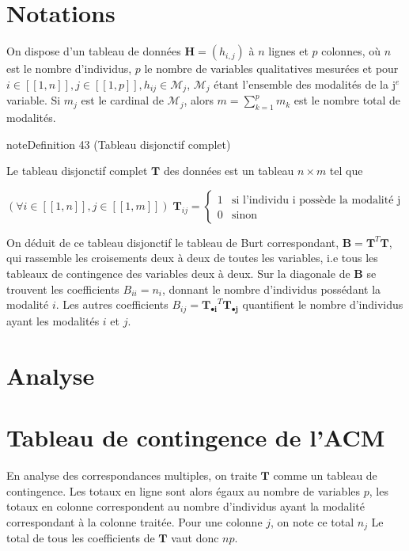 \documentclass[letterpaper,10pt,english]{jupyterBook}
\begin{document}
\section{Notations}
\label{\detokenize{acm:notations}}
\sphinxAtStartPar
On dispose d’un tableau de données \(\mathbf{H}=(h_{i,j})\) à \(n\) lignes et \(p\) colonnes, où \(n\) est le nombre d’individus, \(p\) le nombre de variables qualitatives mesurées et pour \(i\in[\![1,n]\!],j\in[\![1,p]\!],h_{ij}\in\mathcal{M}_j\), \(\mathcal{M}_j\) étant l’ensemble des modalités de la j\(^e\) variable. Si \(m_j\) est le cardinal de \(\mathcal{M}_j\), alors \(m=\sum_{k=1}^p m_k\) est le nombre total de modalités.

\ignorespaces \label{acm:definition-0}
\begin{sphinxadmonition}{note}{Definition 43 (Tableau disjonctif complet)}



\sphinxAtStartPar
Le tableau disjonctif complet \(\mathbf T\) des données est un tableau \(n\times m\) tel que

\sphinxAtStartPar
\((\forall i\in[\![1,n]\!],j\in[\![1, m]\!])\; \mathbf T_{ij} = \left \{ \begin{array}{cl} 1&\textrm{si l'individu i possède la modalité j}\\0 & \textrm{sinon}\end{array}\right .\)
\end{sphinxadmonition}

\ignorespaces 
{}\ignorespaces 
\sphinxAtStartPar
On déduit de ce tableau disjonctif le tableau de Burt correspondant, \(\mathbf B=\mathbf T^T \mathbf T\), qui rassemble les croisements deux à  deux de toutes les variables, i.e tous les tableaux de contingence des variables deux à deux. Sur la diagonale de \(\mathbf B\) se trouvent les coefficients \(B_{ii}=n_i\), donnant le nombre d’individus possédant la modalité \(i\).  Les autres coefficients \(B_{ij} = \mathbf{T_{\bullet i}}^T \mathbf {T_{\bullet j}}\) quantifient le nombre d’individus ayant les modalités \(i\) et \(j\).


\section{Analyse}
\label{\detokenize{acm:analyse}}

\section{Tableau de contingence de l’ACM}
\label{\detokenize{acm:tableau-de-contingence-de-l-acm}}
\sphinxAtStartPar
En analyse des correspondances multiples, on traite \(\mathbf T\) comme un tableau de contingence. Les totaux en ligne sont alors égaux au nombre de variables \(p\), les totaux en colonne correspondent au nombre d’individus ayant la modalité correspondant à la colonne traitée. Pour une colonne \(j\), on note ce total \(n_j\) Le total de tous les coefficients de \(\mathbf T\) vaut donc \(np\).
\end{document}
